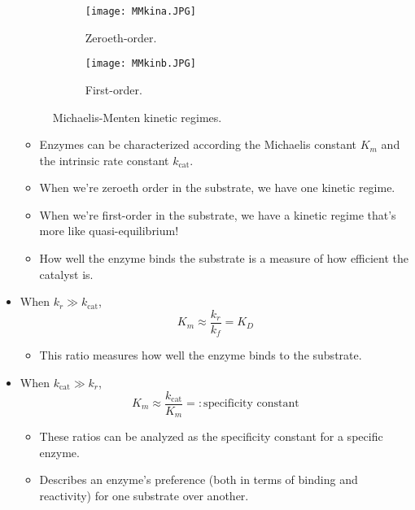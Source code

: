 \documentclass[../notes.tex]{subfiles}
\begin{document}
\begin{itemize}
\begin{figure}[h!]
        \centering
        \begin{subfigure}[b]{0.4\linewidth}
            \centering
            \texttt{[image: MMkina.JPG]}
            \caption{Zeroeth-order.}
            \label{fig:MMkina}
        \end{subfigure}
        \begin{subfigure}[b]{0.4\linewidth}
            \centering
            \texttt{[image: MMkinb.JPG]}
            \caption{First-order.}
            \label{fig:MMkinb}
        \end{subfigure}
        \caption{Michaelis-Menten kinetic regimes.}
        \label{fig:MMkin}
    \end{figure}
    \begin{itemize}
        \item Enzymes can be characterized according the Michaelis constant $K_m$ and the intrinsic rate constant $k_\text{cat}$.
        \item When we're zeroeth order in the substrate, we have one kinetic regime.
        \item When we're first-order in the substrate, we have a kinetic regime that's more like quasi-equilibrium!
        \item How well the enzyme binds the substrate is a measure of how efficient the catalyst is.
    \end{itemize}
    \item When $k_r\gg k_\text{cat}$,
    \begin{equation*}
        K_m \approx \frac{k_r}{k_f} = K_D
    \end{equation*}
    \begin{itemize}
        \item This ratio measures how well the enzyme binds to the substrate.
    \end{itemize}
    \item When $k_\text{cat}\gg k_r$,
    \begin{equation*}
        K_m \approx \frac{k_\text{cat}}{K_m} =: \text{specificity constant}
    \end{equation*}
    \begin{itemize}
        \item These ratios can be analyzed as the specificity constant for a specific enzyme.
        \item Describes an enzyme's preference (both in terms of binding and reactivity) for one substrate over another.
    \end{itemize}

\end{itemize}
\end{document}
